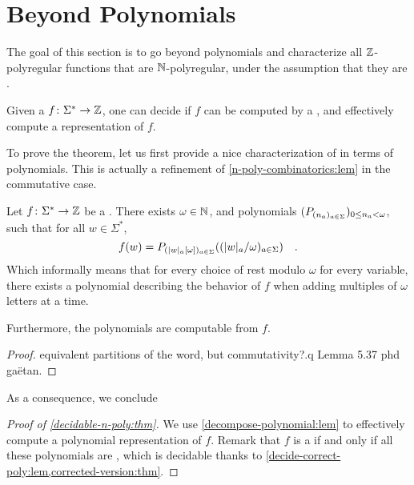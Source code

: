 \section{Beyond Polynomials}
\label{sec:deciding}

The goal of this section is to go beyond polynomials and characterize all
$\mathbb{Z}$-polyregular functions that are $\mathbb{N}$-polyregular, under the assumption
that they are .

\begin{theorem}
    \label{decidable-n-poly:thm}
    Given a 
     $f \colon \Sigma^* \to \mathbb{Z}$,
    one can decide if $f$ can be computed by a ,
    and effectively compute a representation of $f$.
\end{theorem}

To prove the theorem, let us first provide a nice characterization of
  in terms of polynomials.
This is actually a refinement of \cref{n-poly-combinatorics:lem} in the
commutative case.

\begin{lemma}
    \label{decompose-polynomial:lem}
    Let $f \colon \Sigma^* \to \mathbb{Z}$ be a 
    . There exists $\omega \in \mathbb{N}$,
    and polynomials $(P_{(n_a)_{a \in \Sigma}})_{ 0 \leq n_a < \omega}$,
    such that for all $w \in \Sigma^*$,
    \begin{equation*}
        f(w) = P_{\seqof{\card[a]{w} [\omega]}{a \in \Sigma}}
        (\seqof{\card[a]{w} / \omega}{a \in \Sigma}) \quad .
    \end{equation*}
    Which informally means that for every choice of rest modulo $\omega$
    for every variable, there exists a polynomial describing the
    behavior of $f$ when adding multiples of $\omega$ letters at a time.

    Furthermore, the polynomials are computable from $f$.
\end{lemma}
\begin{proof}
    equivalent partitions of the word, but commutativity?.q
    Lemma 5.37 phd gaëtan.
\end{proof}

As a consequence, we conclude 
\begin{proof}[Proof of \cref{decidable-n-poly:thm}]
    We use \cref{decompose-polynomial:lem}
    to effectively compute
    a polynomial representation of $f$. Remark that
    $f$ is a  if and only if
    all these polynomials are ,
    which is decidable thanks to
    \cref{decide-correct-poly:lem,corrected-version:thm}.
\end{proof}


